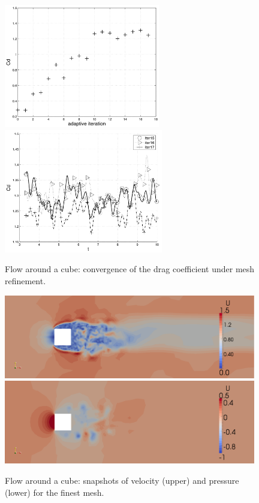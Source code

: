 \begin{figure}
  \centering
  \includegraphics[height=5.4cm]{chapters/hoffman-1/png/fig1a.png}
  \includegraphics[height=5.4cm]{chapters/hoffman-1/png/fig1b.png}
  \caption{Flow around a cube: convergence of the drag coefficient under
    mesh refinement.}
  \label{hoffman-1:fig:cube1}
\end{figure}

\begin{figure}
  \centering
  \includegraphics[width=11cm]{chapters/hoffman-1/png/fig2b.png}
  \medskip
  \includegraphics[width=11cm]{chapters/hoffman-1/png/fig2c.png}
  \caption{Flow around a cube: snapshots of velocity (upper) and pressure
    (lower) for the finest mesh.}
  \label{hoffman-1:fig:cube2}
\end{figure}

